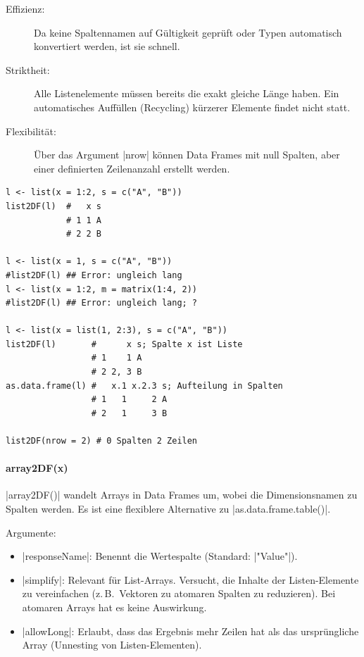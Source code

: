 \documentclass[10pt,twocolumn]{scrartcl}
\renewcommand{\lstinline}{\mycoloredinline}
\begin{document}
\begin{description}
\item[Effizienz:] Da keine Spaltennamen auf Gültigkeit geprüft oder Typen automatisch konvertiert werden, ist sie schnell.
\item[Striktheit:] Alle Listenelemente müssen bereits die exakt gleiche Länge haben. Ein automatisches Auffüllen (Recycling) kürzerer Elemente findet nicht statt.
\item[Flexibilität:] Über das Argument \lstinline|nrow| können Data Frames mit null Spalten, aber einer definierten Zeilenanzahl erstellt werden.
\end{description}

\begin{lstlisting}
l <- list(x = 1:2, s = c("A", "B"))
list2DF(l)  #   x s
            # 1 1 A
            # 2 2 B

l <- list(x = 1, s = c("A", "B"))
#list2DF(l) ## Error: ungleich lang
l <- list(x = 1:2, m = matrix(1:4, 2))
#list2DF(l) ## Error: ungleich lang; ?

l <- list(x = list(1, 2:3), s = c("A", "B"))
list2DF(l)       #      x s; Spalte x ist Liste
                 # 1    1 A
                 # 2 2, 3 B
as.data.frame(l) #   x.1 x.2.3 s; Aufteilung in Spalten
                 # 1   1     2 A
                 # 2   1     3 B

list2DF(nrow = 2) # 0 Spalten 2 Zeilen
\end{lstlisting}


\paragraph{array2DF(x)}

\lstinline|array2DF()| wandelt Arrays in Data Frames um, wobei die Dimensionsnamen zu Spalten werden. Es ist eine flexiblere Alternative zu \lstinline|as.data.frame.table()|.

Argumente:
\begin{itemize}
\item \lstinline|responseName|: Benennt die Wertespalte (Standard: \lstinline|"Value"|).
\item \lstinline|simplify|: Relevant für List-Arrays. Versucht, die Inhalte der Listen-Elemente zu vereinfachen (z.\,B.\ Vektoren zu atomaren Spalten zu reduzieren). Bei atomaren Arrays hat es keine Auswirkung.
\item \lstinline|allowLong|: Erlaubt, dass das Ergebnis mehr Zeilen hat als das ursprüngliche Array (Unnesting von Listen-Elementen).
\end{itemize}
\end{document}
